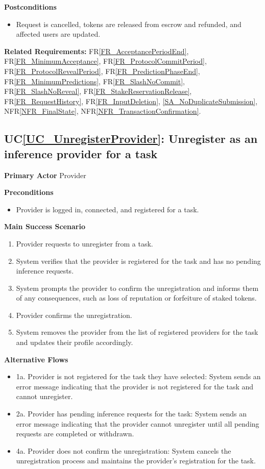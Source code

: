 \documentclass[12pt]{article}
\newcounter{ucnum} %
\newcommand{\ucref}[1]{UC\ref{#1}}
\newcommand{\rref}[1]{FR\ref{#1}}
\newcommand{\nfrref}[1]{NFR\ref{#1}}
\begin{document}
\textbf{Postconditions}
\begin{itemize}
\item Request is cancelled, tokens are released from escrow and refunded, and affected users are updated.
\end{itemize}

\textbf{Related Requirements:} \rref{FR_AcceptancePeriodEnd}, \rref{FR_MinimumAcceptance}, \rref{FR_ProtocolCommitPeriod}, \rref{FR_ProtocolRevealPeriod}, \rref{FR_PredictionPhaseEnd}, \rref{FR_MinimumPredictions}, \rref{FR_SlashNoCommit}, \rref{FR_SlashNoReveal}, \rref{FR_StakeReservationRelease}, \rref{FR_RequestHistory}, \rref{FR_InputDeletion}, \ref{SA_NoDuplicateSubmission}, \nfrref{NFR_FinalState}, \nfrref{NFR_TransactionConfirmation}.

 \label{UC_UnregisterProvider}
\subsection{\ucref{UC_UnregisterProvider}: Unregister as an inference provider for a task}

\textbf{Primary Actor}
Provider

\textbf{Preconditions}
\begin{itemize}
\item Provider is logged in, connected, and registered for a task.
\end{itemize}

\textbf{Main Success Scenario}
\begin{enumerate}
\item Provider requests to unregister from a task.
\item System verifies that the provider is registered for the task and has no pending inference requests.
\item System prompts the provider to confirm the unregistration and informs them of any consequences, such as loss of reputation or forfeiture of staked tokens.
\item Provider confirms the unregistration.
\item System removes the provider from the list of registered providers for the task and updates their profile accordingly.
\end{enumerate}

\textbf{Alternative Flows}
\begin{itemize}
\item 1a. Provider is not registered for the task they have selected: System sends an error message indicating that the provider is not registered for the task and cannot unregister.
\item 2a. Provider has pending inference requests for the task: System sends an error message indicating that the provider cannot unregister until all pending requests are completed or withdrawn.
\item 4a. Provider does not confirm the unregistration: System cancels the unregistration process and maintains the provider's registration for the task.
\end{itemize}
\end{document}
